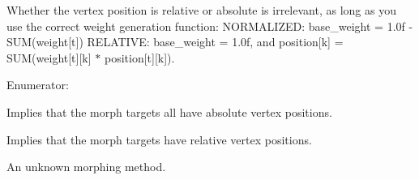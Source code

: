 Whether the vertex position is relative or absolute is irrelevant, as long as you use the correct weight generation function: NORMALIZED: base\_\-weight = 1.0f -\/ SUM(weight\mbox{[}t\mbox{]}) RELATIVE: base\_\-weight = 1.0f, and position\mbox{[}k\mbox{]} = SUM(weight\mbox{[}t\mbox{]}\mbox{[}k\mbox{]} $\ast$ position\mbox{[}t\mbox{]}\mbox{[}k\mbox{]}). \begin{Desc}
\item[Enumerator: ]\par
\begin{description}
\item[{\em 
\hypertarget{namespaceFUDaeMorphMethod_a097fa073638c4df9edf9479f8561329ea7f8d1d485cf8763e1296f6b33ef7a052}{
NORMALIZED}
\label{namespaceFUDaeMorphMethod_a097fa073638c4df9edf9479f8561329ea7f8d1d485cf8763e1296f6b33ef7a052}
}]Implies that the morph targets all have absolute vertex positions. \item[{\em 
\hypertarget{namespaceFUDaeMorphMethod_a097fa073638c4df9edf9479f8561329ea8fa8a945887cc2b426e5835fc5985862}{
RELATIVE}
\label{namespaceFUDaeMorphMethod_a097fa073638c4df9edf9479f8561329ea8fa8a945887cc2b426e5835fc5985862}
}]Implies that the morph targets have relative vertex positions. \item[{\em 
\hypertarget{namespaceFUDaeMorphMethod_a097fa073638c4df9edf9479f8561329eae8b1c9c9348ab231bb1220fe64eab392}{
UNKNOWN}
\label{namespaceFUDaeMorphMethod_a097fa073638c4df9edf9479f8561329eae8b1c9c9348ab231bb1220fe64eab392}
}]An unknown morphing method. \end{description}
\end{Desc}



